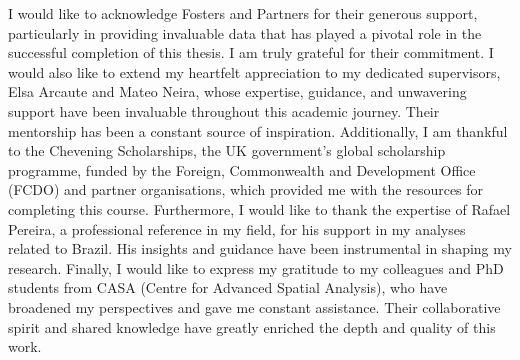 \begin{acknowledgements}

I would like to acknowledge Fosters and Partners for their generous support, particularly in providing invaluable data that has played a pivotal role in the successful completion of this thesis. I am truly grateful for their commitment.
I would also like to extend my heartfelt appreciation to my dedicated supervisors, Elsa Arcaute and Mateo Neira, whose expertise, guidance, and unwavering support have been invaluable throughout this academic journey. Their mentorship has been a constant source of inspiration.
Additionally, I am thankful to the Chevening Scholarships, the UK government’s global scholarship programme, funded by the Foreign, Commonwealth and Development Office (FCDO) and partner organisations, which provided me with the resources for completing this course.
Furthermore, I would like to thank the expertise of Rafael Pereira, a professional reference in my field, for his support in my analyses related to Brazil. His insights and guidance have been instrumental in shaping my research.
Finally, I would like to express my gratitude to my colleagues and PhD students from CASA (Centre for Advanced Spatial Analysis), who have broadened my perspectives and gave me constant assistance. Their collaborative spirit and shared knowledge have greatly enriched the depth and quality of this work.

\end{acknowledgements}

\setcounter{tocdepth}{2} 

\tableofcontents
\listoffigures
\listoftables

